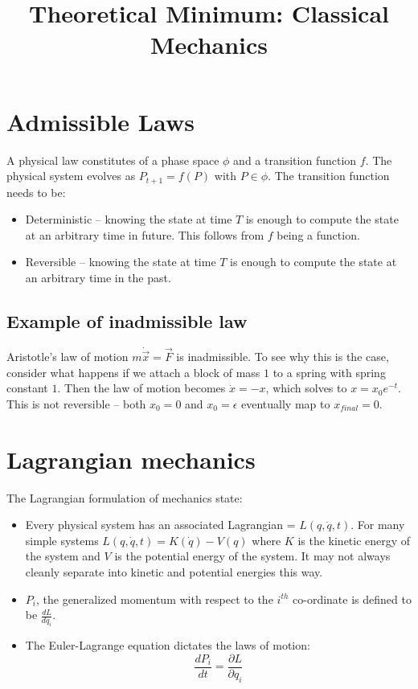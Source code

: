 \documentclass[12pt]{article}
\begin{document}
\title{Theoretical Minimum: Classical Mechanics}

\maketitle

\section{Admissible Laws}

A physical law constitutes of a phase space $\phi$ and a transition function
$f$.  The physical system evolves as $P_{t+1} = f(P)$ with $P \in \phi$.  The
transition function needs to be:

\begin{itemize}
\item Deterministic -- knowing the state at time $T$ is enough to compute the
  state at an arbitrary time in future.  This follows from $f$ being a
  function.
\item Reversible -- knowing the state at time $T$ is enough to compute the state
  at an arbitrary time in the past.
\end{itemize}

\subsection{Example of inadmissible law}

Aristotle's law of motion $m\dot{\overrightarrow{x}} = \overrightarrow{F}$ is
inadmissible.  To see why this is the case, consider what happens if we attach a
block of mass $1$ to a spring with spring constant $1$.  Then the law of motion
becomes $\dot{x} = -x$, which solves to $x=x_0 e^{-t}$.  This is not reversible
-- both $x_0=0$ and $x_0 = \epsilon$ eventually map to $x_{final}=0$.

\section{Lagrangian mechanics}

The Lagrangian formulation of mechanics state:

\begin{itemize}
\item Every physical system has an associated Lagrangian = $L(q, \dot{q}, t)$.
  For many simple systems $L(q, \dot{q}, t) = K(\dot{q}) - V(q)$ where $K$ is
  the kinetic energy of the system and $V$ is the potential energy of the
  system.  It may not always cleanly separate into kinetic and potential
  energies this way.
\item $P_i$, the generalized momentum with respect to the $i^{th}$ co-ordinate
  is defined to be $\frac{dL}{d\dot{q_i}}$.
\item The Euler-Lagrange equation dictates the laws of motion:
  $$\frac{dP_i}{dt} = \frac{\partial L}{\partial q_i}$$
\end{itemize}
\end{document}
